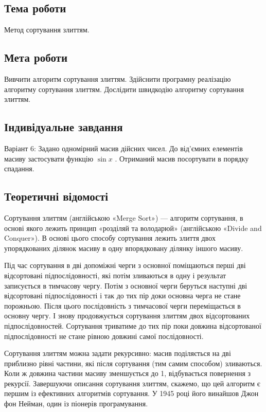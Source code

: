 \documentclass[12pt]{extarticle}
\begin{document}
\subsection*{Тема роботи} 
Метод сортування злиттям.

\subsection*{Мета роботи} Вивчити алгоритм сортування злиттям. Здійснити програмну реалізацію алгоритму сортування злиттям. Дослідити швидкодію алгоритму сортування злиттям.

\subsection*{Індивідуальне завдання } 
Варіант 6:
Задано одномірний масив дійсних чисел. До від’ємних елементів масиву застосувати функцію $\sin x$ . Отриманий масив посортувати в порядку спадання.


\subsection*{Теоретичні відомості}
Сортування злиттям (англійською «Merge Sort») — алгоритм сортування, в основі якого лежить принцип «розділяй та володарюй» (англійською «Divide and Conquer»). В основі цього способу сортування лежить злиття двох упорядкованих ділянок масиву в одну впорядковану ділянку іншого масиву.

Під час сортування в дві допоміжні черги з основної поміщаються перші дві відсортовані підпослідовності, які потім зливаються в одну і результат записується в тимчасову чергу. Потім з основної черги беруться наступні дві відсортовані підпослідовності і так до тих пір доки основна черга не стане порожньою. Після цього послідовність з тимчасової черги переміщається в основну чергу. І знову продовжується сортування злиттям двох відсортованих підпослідовностей. Сортування триватиме до тих пір поки довжина відсортованої підпослідовності не стане рівною довжині самої послідовності.

Сортування злиттям можна задати рекурсивно: масив поділяється на дві приблизно рівні частини, які після сортування (тим самим способом) зливаються. Коли ж довжина частини масиву зменшується до 1, відбувається повернення з рекурсії. Завершуючи описання сортування злиттям, скажемо, що цей алгоритм є першим із ефективних алгоритмів сортування. У 1945 році його винайшов Джон фон Нейман, один із піонерів програмування.
\end{document}
